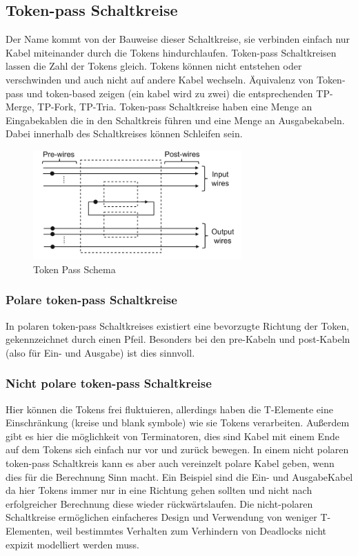\documentclass[11pt,a4paper]{article}
\begin{document}
\subsection{Token-pass Schaltkreise}
Der Name kommt von der Bauweise dieser Schaltkreise, sie verbinden einfach nur
Kabel miteinander durch die Tokens hindurchlaufen.
%
Token-pass Schaltkreisen lassen die Zahl der Tokens gleich.
%
Tokens können nicht entstehen oder verschwinden und auch 
nicht auf andere Kabel wechseln.
%
Äquivalenz von Token-pass und token-based zeigen (ein kabel wird zu zwei)
die entsprechenden TP-Merge, TP-Fork, TP-Tria.
%
Token-pass Schaltkreise haben eine Menge an Eingabekablen die in
den Schaltkreis führen und eine Menge an Ausgabekabeln.
%
Dabei innerhalb des Schaltkreises können Schleifen sein. 
%

\begin{figure}[h]
    \centering
    \includegraphics[width=8cm]{bilder/TokenPassScheme.png}
    \caption{Token Pass Schema}
    \label{fig:tokenPassScheme}
\end{figure} 

\subsubsection{Polare token-pass Schaltkreise}
In polaren token-pass Schaltkreises existiert eine bevorzugte Richtung
der Token, gekennzeichnet durch einen Pfeil.
%
Besonders bei den pre-Kabeln und post-Kabeln (also für Ein- und Ausgabe)
ist dies sinnvoll.

\subsubsection{Nicht polare token-pass Schaltkreise}
Hier können die Tokens frei fluktuieren, allerdings haben die T-Elemente eine
Einschränkung (kreise und blank symbole) wie sie Tokens verarbeiten.
%
Außerdem gibt es hier die möglichkeit von Terminatoren, dies sind Kabel
mit einem Ende auf dem Tokens sich einfach nur vor und zurück bewegen.
%
In einem nicht polaren token-pass Schaltkreis kann es aber auch vereinzelt
polare Kabel geben, wenn dies für die Berechnung Sinn macht.
%
Ein Beispiel sind die Ein- und AusgabeKabel da hier Tokens immer nur in eine 
Richtung gehen sollten und nicht nach erfolgreicher Berechnung diese 
wieder rückwärtslaufen.
%
Die nicht-polaren Schaltkreise ermöglichen einfacheres Design und Verwendung
von weniger T-Elementen, weil bestimmtes Verhalten zum Verhindern von
Deadlocks nicht expizit modelliert werden muss.
\end{document}
